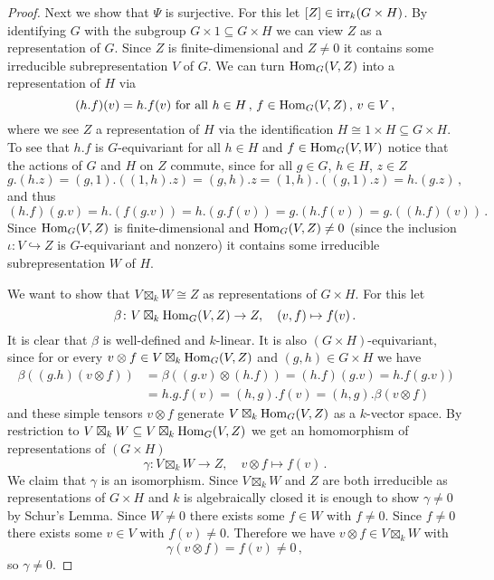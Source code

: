 \begin{proof}
  Next we show that $\Psi$ is surjective.
  For this let $[Z] \in \operatorname{irr}_k(G \times H)$.
  By identifying $G$ with the subgroup $G \times 1 \subseteq G \times H$ we can view $Z$ as a representation of $G$.
  Since $Z$ is finite-dimensional and $Z \neq 0$ it contains some irreducible subrepresentation $V$ of $G$.
  We can turn $\operatorname{Hom}_G(V, Z)$ into a representation of $H$ via
  \[
      (h.f)(v)
    = h.f(v)
    \text{ for all }
    h \in H \,,\,
    f \in \operatorname{Hom}_G(V, Z) \,,\,
    v \in V \,,
  \]
  where we see $Z$ a representation of $H$ via the identification $H \cong 1 \times H \subseteq G \times H$.
  To see that $h.f$ is $G$-equivariant for all $h \in H$ and $f \in \operatorname{Hom}_G(V,W)$ notice that the actions of $G$ and $H$ on $Z$ commute, since for all $g \in G$, $h \in H$, $z \in Z$
  \[
      g.(h.z)
    = (g,1).((1,h).z)
    = (g,h).z
    = (1,h).((g,1).z)
    = h.(g.z) \,,
  \]
  and thus
  \[
      (h.f)(g.v)
    = h.(f(g.v))
    = h.(g.f(v))
    = g.(h.f(v))
    = g.((h.f)(v)) \,.
  \]
  Since $\operatorname{Hom}_G(V, Z)$ is finite-dimensional and $\operatorname{Hom}_G(V, Z) \neq 0$ (since the inclusion $\iota \colon V \hookrightarrow Z$ is $G$-equivariant and nonzero) it contains some irreducible subrepresentation $W$ of $H$.
  
  We want to show that $V \boxtimes_k W \cong Z$ as representations of $G \times H$.
  For this let
  \[
            \beta
    \colon  V \boxtimes_k \operatorname{Hom}_G(V,Z)
    \to     Z,
    \quad   (v, f)
    \mapsto f(v) \,.
  \]
  It is clear that $\beta$ is well-defined and $k$-linear.
  It is also $(G \times H)$-equivariant, since for or every $v \otimes f \in V \boxtimes_k \operatorname{Hom}_G(V,Z)$ and $(g,h) \in G \times H$ we have
  \begin{align*}
        \beta((g.h)(v \otimes f))
    &=  \beta((g.v) \otimes (h.f))
     =  (h.f)(g.v)
     =  h.f(g.v)) \\
    &=  h.g.f(v)
     =  (h,g).f(v)
     =  (h,g).\beta(v \otimes f)
  \end{align*}
  and these simple tensors $v \otimes f$ generate $V \boxtimes_k \operatorname{Hom}_G(V,Z)$ as a $k$-vector space.
  By restriction to $V \boxtimes_k W \subseteq V \boxtimes_k \operatorname{Hom}_G(V,Z)$ we get an homomorphism of representations of $(G \times H)$
  \[
            \gamma
    \colon  V \boxtimes_k W
    \to     Z,
    \quad   v \otimes f
    \mapsto f(v) \,.
  \]
  We claim that $\gamma$ is an isomorphism.
  Since $V \boxtimes_k W$ and $Z$ are both irreducible as representations of $G \times H$ and $k$ is algebraically closed it is enough to show $\gamma \neq 0$ by Schur’s Lemma.
  Since $W \neq 0$ there exists some $f \in W$ with $f \neq 0$.
  Since $f \neq 0$ there exists some $v \in V$ with $f(v) \neq 0$.
  Therefore we have $v \otimes f \in V \boxtimes_k W$ with
  \[
          \gamma(v \otimes f)
    =     f(v)
    \neq  0 \,,
  \]
  so $\gamma \neq 0$.
  

\end{proof}
